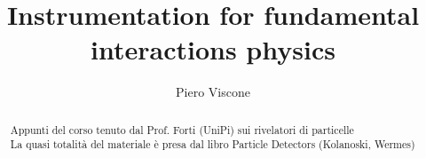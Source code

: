 \documentclass[a4paper]{report}
\author{Piero Viscone}
\title{Instrumentation for fundamental interactions physics}
\date{}
\begin{document}
\maketitle

\begin{abstract}
	Appunti del corso tenuto dal Prof. Forti (UniPi) sui rivelatori di particelle\\ 
	La quasi totalità del materiale è presa dal libro Particle Detectors (Kolanoski, Wermes) \cite{Kolanoski:2020ksk}
\end{abstract}

\newpage

\tableofcontents
{}
\newpage
\iffalse

\fi





\appendix
\appendixpage
\iffalse


\fi

\newpage
\printbibliography
\end{document}
